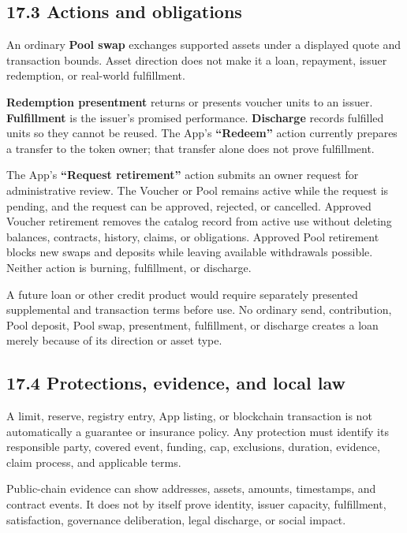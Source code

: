 \documentclass[11pt]{article}
\begin{document}
\subsection*{17.3 Actions and obligations}

An ordinary \textbf{Pool swap} exchanges supported assets under a displayed quote and transaction bounds. Asset direction does not make it a loan, repayment, issuer redemption, or real-world fulfillment.

\textbf{Redemption presentment} returns or presents voucher units to an issuer. \textbf{Fulfillment} is the issuer's promised performance. \textbf{Discharge} records fulfilled units so they cannot be reused. The App's \textbf{``Redeem''} action currently prepares a transfer to the token owner; that transfer alone does not prove fulfillment.

The App's \textbf{``Request retirement''} action submits an owner request for administrative review. The Voucher or Pool remains active while the request is pending, and the request can be approved, rejected, or cancelled. Approved Voucher retirement removes the catalog record from active use without deleting balances, contracts, history, claims, or obligations. Approved Pool retirement blocks new swaps and deposits while leaving available withdrawals possible. Neither action is burning, fulfillment, or discharge.

A future loan or other credit product would require separately presented supplemental and transaction terms before use. No ordinary send, contribution, Pool deposit, Pool swap, presentment, fulfillment, or discharge creates a loan merely because of its direction or asset type.

\subsection*{17.4 Protections, evidence, and local law}

A limit, reserve, registry entry, App listing, or blockchain transaction is not automatically a guarantee or insurance policy. Any protection must identify its responsible party, covered event, funding, cap, exclusions, duration, evidence, claim process, and applicable terms.

Public-chain evidence can show addresses, assets, amounts, timestamps, and contract events. It does not by itself prove identity, issuer capacity, fulfillment, satisfaction, governance deliberation, legal discharge, or social impact.
\end{document}
